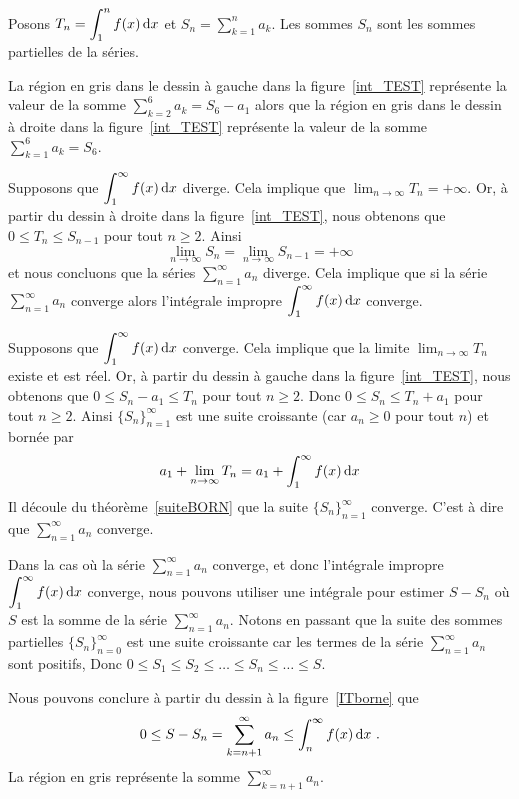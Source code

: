 {Posons $\displaystyle T_n = \int_1^n f(x)\,\mathrm{d}x$ et
$\displaystyle S_n = \sum_{k=1}^n a_k$.  Les sommes $S_n$ sont les
sommes partielles de la séries.

La région en gris dans le dessin à gauche dans la
figure~\ref{int_TEST} représente la valeur de la somme
$\displaystyle \sum_{k=2}^6 a_k = S_6 - a_1$ alors que la région en gris
dans le dessin à droite dans la figure~\ref{int_TEST} représente la
valeur de la somme $\displaystyle \sum_{k=1}^6 a_k = S_6$.

 Supposons que $\displaystyle \int_1^\infty f(x)\,\mathrm{d}x$ diverge. Cela
implique que $\displaystyle \lim_{n\rightarrow \infty} T_n = +\infty$.
Or, à partir du dessin à droite dans la figure~\ref{int_TEST}, nous
obtenons que $0 \leq T_n \leq S_{n-1}$ pour tout $n\geq 2$.  Ainsi
\[
\lim_{n\rightarrow \infty} S_n =
\lim_{n\rightarrow \infty} S_{n-1} = +\infty
\]
et nous concluons que la séries $\displaystyle \sum_{n=1}^\infty a_n$ diverge.
Cela implique que si la série $\displaystyle \sum_{n=1}^\infty a_n$
converge alors l'intégrale impropre
$\displaystyle \int_1^\infty f(x)\,\mathrm{d}x$ converge.

 Supposons que $\displaystyle \int_1^\infty f(x)\,\mathrm{d}x$ converge.
Cela implique que la limite $\displaystyle \lim_{n\rightarrow \infty} T_n$
existe et est réel.  Or, à partir du dessin à gauche dans la
figure~\ref{int_TEST}, nous obtenons que
$0 \leq S_n - a_1 \leq T_n$ pour tout $n\geq 2$.  Donc
$0 \leq S_n \leq T_n + a_1$ pour tout $n\geq 2$.  Ainsi
$\displaystyle \{S_n\}_{n=1}^\infty$ est une suite croissante (car
$a_n \geq 0$ pour tout $n$) et bornée par
\[
a_1 + \lim_{n\rightarrow \infty} T_n = a_1 + \int_1^\infty f(x)\,\mathrm{d}x
\]
Il découle du théorème~\ref{suiteBORN} que la suite
$\displaystyle \{S_n\}_{n=1}^\infty$ converge.  C'est à dire que
$\displaystyle \sum_{n=1}^\infty a_n$ converge.

\begin{rmk}
Dans la cas où la série $\displaystyle \sum_{n=1}^\infty a_n$
converge, et donc l'intégrale impropre
$\displaystyle \int_1^\infty f(x)\,\mathrm{d}x$ converge, nous pouvons utiliser
une intégrale pour estimer $S - S_n$ où $S$ est la somme de la
série $\displaystyle \sum_{n=1}^\infty a_n$.
Notons en passant que la suite des sommes partielles
$\displaystyle \{S_n\}_{n=0}^\infty$ est une suite croissante car les
termes de la série $\displaystyle \sum_{n=1}^\infty a_n$ sont
positifs,  Donc
$0 \leq S_1 \leq S_2 \leq \ldots \leq S_n \leq \ldots \leq S$.

Nous pouvons conclure à partir du dessin à la figure~\ref{ITborne} que
\[
0 \leq S - S_n = \sum_{k=n+1}^\infty a_n \leq \int_n^\infty f(x) \,\mathrm{d}x \ .
\]
La région en gris représente la somme
$\displaystyle \sum_{k=n+1}^\infty a_n$.
\end{rmk}

}
